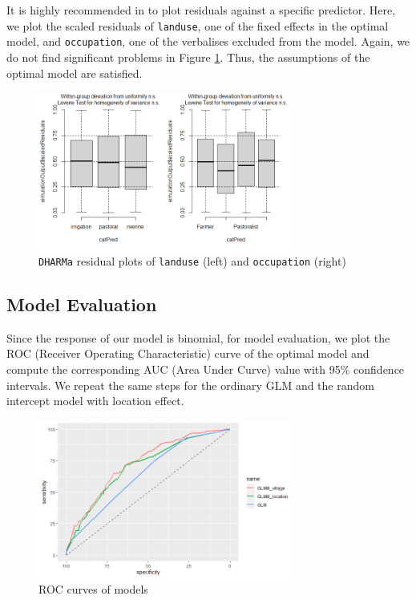 \documentclass[11pt,twoside]{article}
\numberwithin{Theorem}{section}
\numberwithin{Definition}{section}
\numberwithin{Lemma}{section}
\numberwithin{Algorithm}{section}
\numberwithin{equation}{section}
\begin{document}
It is highly recommended in \cite{dharma} to plot residuals against a specific predictor. Here, we plot the scaled residuals of \texttt{landuse}, one of the fixed effects in the optimal model, and \texttt{occupation}, one of the verbalises excluded from the model. Again, we do not find significant problems in Figure \ref{fig:diagnosis2}. Thus, the assumptions of the optimal model are satisfied.

\begin{figure}[!h]
	\centering
	\includegraphics[width = 0.75\textwidth]{Images/diagnosis2.png}
	\caption{\texttt{DHARMa} residual plots of \texttt{landuse} (left) and \texttt{occupation} (right)}
	\label{fig:diagnosis2}	
\end{figure} 

\subsection{Model Evaluation}

Since the response of our model is binomial, for model evaluation, we plot the ROC (Receiver Operating Characteristic) curve of the optimal model and compute the corresponding AUC (Area Under Curve) value with 95\% confidence intervals. We repeat the same steps for the ordinary GLM and the random intercept model with location effect. 

\begin{figure}[!h]
	\centering
	\includegraphics[width = 0.75\textwidth]{Images/ROC.png}
	\caption{ROC curves of models} 
	\label{fig:pROC}
\end{figure}
\end{document}
